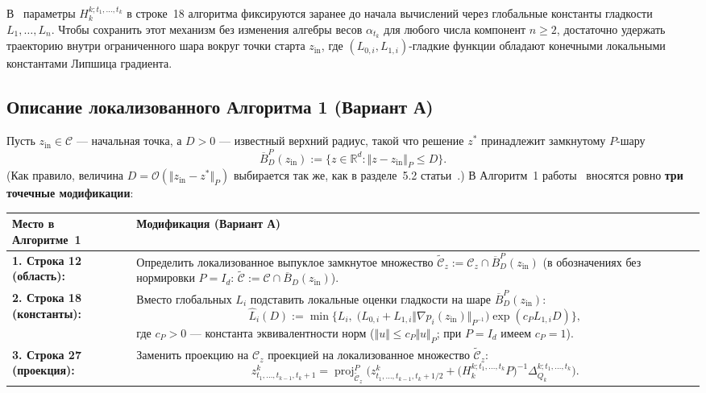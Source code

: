 \documentclass[11pt, a4paper]{article}
\theoremstyle{definition}
\begin{document}
В~\cite{Borodich2025} параметры $H_k^{k; t_1, \dots, t_k}$ в строке~18 алгоритма фиксируются заранее до начала вычислений через глобальные константы гладкости $L_1, \dots, L_n$. Чтобы сохранить этот механизм без изменения алгебры весов $\alpha_{t_k}$ для любого числа компонент $n \ge 2$, достаточно удержать траекторию внутри ограниченного шара вокруг точки старта $z_{\mathrm{in}}$, где $(L_{0,i}, L_{1,i})$-гладкие функции обладают конечными локальными константами Липшица градиента.

\subsection{Описание локализованного Алгоритма 1 (Вариант А)}

Пусть $z_{\mathrm{in}} \in \mathcal{C}$ --- начальная точка, а $D > 0$ --- известный верхний радиус, такой что решение $z^*$ принадлежит замкнутому $P$-шару
\[
\overline{B}_D^P(z_{\mathrm{in}}) := \big\{z \in \mathbb{R}^d : \Vert z - z_{\mathrm{in}} \Vert_P \le D\big\}.
\]
(Как правило, величина $D = \mathcal{O}(\Vert z_{\mathrm{in}} - z^* \Vert_P)$ выбирается так же, как в разделе~5.2 статьи~\cite{Borodich2025}.) В Алгоритм~1 работы~\cite{Borodich2025} вносятся ровно \textbf{три точечные модификации}:

\begin{center}
\begin{tabularx}{\textwidth}{l X}
\toprule
\textbf{Место в Алгоритме~1} & \textbf{Модификация (Вариант А)} \\
\midrule
\textbf{1. Строка 12 (область):} & Определить локализованное выпуклое замкнутое множество $\widetilde{\mathcal{C}}_z := \mathcal{C}_z \cap \overline{B}_D^P(z_{\mathrm{in}})$ (в обозначениях без нормировки $P = I_d$: $\widetilde{\mathcal{C}} := \mathcal{C} \cap \overline{B}_D(z_{\mathrm{in}})$). \\
\addlinespace
\textbf{2. Строка 18 (константы):} & Вместо глобальных $L_i$ подставить локальные оценки гладкости на шаре $\overline{B}_D^P(z_{\mathrm{in}})$:
\[
\widehat{L}_i(D) := \min\Big\{L_i,\; \big(L_{0,i} + L_{1,i} \Vert \nabla p_i(z_{\mathrm{in}}) \Vert_{P^{-1}}\big) \exp(c_P L_{1,i} D)\Big\},
\]
где $c_P > 0$ --- константа эквивалентности норм ($\Vert u \Vert \le c_P \Vert u \Vert_P$; при $P = I_d$ имеем $c_P = 1$). \\
\addlinespace
\textbf{3. Строка 27 (проекция):} & Заменить проекцию на $\mathcal{C}_z$ проекцией на локализованное множество $\widetilde{\mathcal{C}}_z$:
\[
z_{t_1, \dots, t_{k-1}, t_k + 1}^k = \operatorname{proj}_{\widetilde{\mathcal{C}}_z}^P\Big(z_{t_1, \dots, t_{k-1}, t_k + 1/2}^k + \big(H_k^{k; t_1, \dots, t_k} P\big)^{-1} \Delta_{Q_k}^{k; t_1, \dots, t_k}\Big).
\]
\\
\bottomrule
\end{tabularx}
\end{center}
\end{document}
